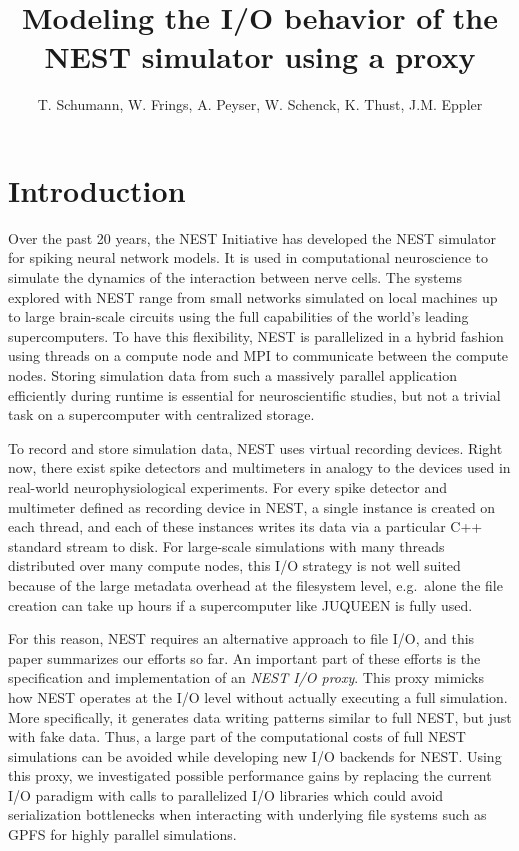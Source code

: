 \documentclass[]{YIC2015}
\title{Modeling the I/O behavior of the NEST simulator using a proxy}
\author[T. Schumann et al.]{%
  T. Schumann\authref{a}\corref,
  W. Frings\authref{b},
  A. Peyser\authref{c},
  W. Schenck\authref{c},
  K. Thust\authref{b},
  J.M. Eppler\authref{c}
}
\begin{document}
\maketitle

\section{Introduction}
%
Over the past 20 years, the NEST Initiative \cite{NESTInitiative} has
developed the NEST \cite{NEST} simulator for spiking neural network
models. It is used in computational neuroscience to simulate the
dynamics of the interaction between nerve cells. The systems explored
with NEST range from small networks simulated on local machines up to
large brain-scale circuits using the full capabilities of the world's
leading supercomputers. To have this flexibility, NEST is parallelized
in a hybrid fashion using threads on a compute node and MPI to
communicate between the compute nodes. Storing
simulation data from such a massively parallel application efficiently
during runtime is essential for neuroscientific studies, but not a
trivial task on a supercomputer with centralized storage.

To record and store simulation data, NEST uses virtual recording devices. Right
now, there exist spike detectors and multimeters in analogy to the devices used
in real-world neurophysiological experiments. For every spike detector and
multimeter defined as recording device in NEST, a single instance is created on
each thread, and each of these instances writes its data via a particular C++
standard stream to disk. For large-scale simulations with many threads
distributed over many compute nodes, this I/O strategy is not well suited
because of the large metadata overhead at the filesystem level, e.g.~alone the
file creation can take up hours if a supercomputer like JUQUEEN is fully used.

For this reason, NEST requires an alternative approach to file I/O, and this
paper summarizes our efforts so far. An important part of these efforts is the
specification and implementation of an \emph{NEST I/O proxy}. This proxy mimicks
how NEST operates at the I/O level without actually executing a full simulation.
More specifically, it generates data writing patterns similar to full NEST, but
just with fake data. Thus, a large part of the computational costs of full NEST
simulations can be avoided while developing new I/O backends for NEST. Using
this proxy, we investigated possible performance gains by replacing the current
I/O paradigm with calls to parallelized I/O libraries which could avoid
serialization bottlenecks when interacting with underlying file systems such as
GPFS \cite{GPFS} for highly parallel simulations.
\end{document}
